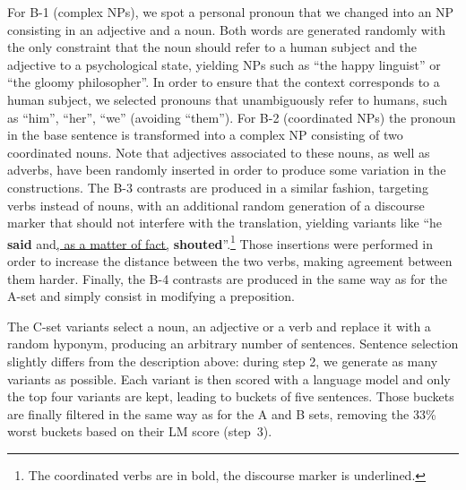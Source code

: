 \documentclass[11pt,letterpaper,final,nohyperref]{article}
\begin{document}
For B-1 (complex NPs), we spot a personal pronoun that we changed into an NP consisting in an adjective and a noun. Both words are generated randomly with
the only constraint that the noun should refer to a human subject and the adjective to a psychological state, yielding NPs such as ``the happy linguist'' or ``the gloomy philosopher''.  In order to ensure that the context corresponds to a human subject, we selected pronouns that unambiguously refer to humans, such as ``him'', ``her'', ``we''
(avoiding ``them''). 
For B-2 (coordinated NPs) the pronoun in the base sentence is transformed into a complex NP consisting of two
coordinated nouns. Note that adjectives associated to these nouns, as well as adverbs, have been randomly inserted in order to produce some variation in the constructions.
The B-3 contrasts are produced in a similar fashion, targeting verbs instead of nouns, with an additional random generation of a discourse marker that should not interfere with the translation, yielding variants like ``he \textbf{said} and\underline{, as a matter of fact,} \textbf{shouted}''.\footnote{The coordinated verbs are in bold, the discourse marker is underlined.}
Those insertions were performed in order to increase the distance between the two verbs, making agreement between them harder.
Finally, the B-4 contrasts are produced in the same way as for the A-set and simply consist in modifying a preposition.

The C-set variants select a noun, an adjective or a verb and replace it with a random hyponym, producing an arbitrary number of
sentences. Sentence selection slightly differs from the description above: during step 2, we generate as many variants as possible. Each variant is then scored with a language model and only the top four variants are kept, leading to buckets of five sentences. Those buckets are finally filtered in the same way as for the A and B sets, removing the 33\% worst buckets based on their LM score (step~3).

\end{document}
